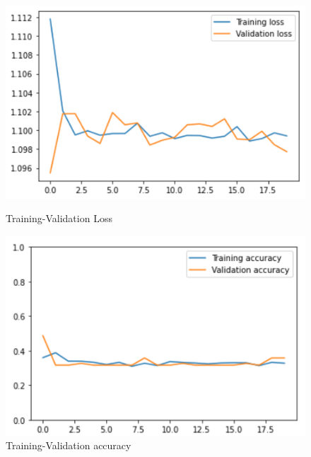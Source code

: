 \documentclass[11pt,a4paper]{article}
\theoremstyle{definition}
\begin{document}
\begin{figure}[H]
  \centering
  \begin{minipage}[b]{0.45\textwidth}
    \includegraphics[scale=0.75]{./images/vgg2loss}
	\caption{Training-Validation Loss}
  \end{minipage}
  \hfill
  \begin{minipage}[b]{0.45\textwidth}
    \includegraphics[scale=0.75]{./images/vgg2acc}
	\caption{Training-Validation accuracy}
  \end{minipage}
\end{figure}
\end{document}
